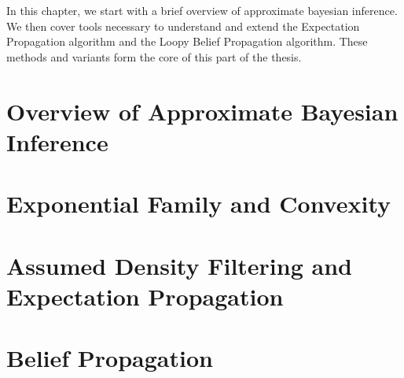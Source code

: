 
In this chapter, we start with a brief overview of approximate bayesian inference. We then cover tools  necessary to understand and extend the Expectation Propagation algorithm and the Loopy Belief Propagation algorithm. These methods and variants form the core of this part of the thesis.

\section{Overview of Approximate Bayesian Inference}



\section{\label{point:expof-convex}Exponential Family and Convexity}





\section{\label{s:ADF+EP}Assumed Density Filtering and Expectation Propagation}


\section{\label{bg:belief-propag}Belief Propagation}

